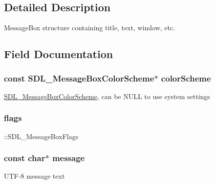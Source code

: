 \subsection{Detailed Description}
Message\+Box structure containing title, text, window, etc. 

\subsection{Field Documentation}
\subsubsection[{\texorpdfstring{color\+Scheme}{colorScheme}}]{\setlength{\rightskip}{0pt plus 5cm}const {\bf S\+D\+L\+\_\+\+Message\+Box\+Color\+Scheme}$\ast$ color\+Scheme}\hypertarget{struct_s_d_l___message_box_data_afcad43ea8520ac57b30b35bee0077618}{}\label{struct_s_d_l___message_box_data_afcad43ea8520ac57b30b35bee0077618}
\hyperlink{struct_s_d_l___message_box_color_scheme}{S\+D\+L\+\_\+\+Message\+Box\+Color\+Scheme}, can be N\+U\+LL to use system settings 
\subsubsection[{\texorpdfstring{flags}{flags}}]{ flags}\hypertarget{struct_s_d_l___message_box_data_a048097c5cc2146ce1ff2450684f1b51c}{}\label{struct_s_d_l___message_box_data_a048097c5cc2146ce1ff2450684f1b51c}
\+::\+S\+D\+L\+\_\+\+Message\+Box\+Flags 
\subsubsection[{\texorpdfstring{message}{message}}]{\setlength{\rightskip}{0pt plus 5cm}const char$\ast$ message}\hypertarget{struct_s_d_l___message_box_data_a254bf0858da09c96a48daf64404eb4f8}{}\label{struct_s_d_l___message_box_data_a254bf0858da09c96a48daf64404eb4f8}
U\+T\+F-\/8 message text 
